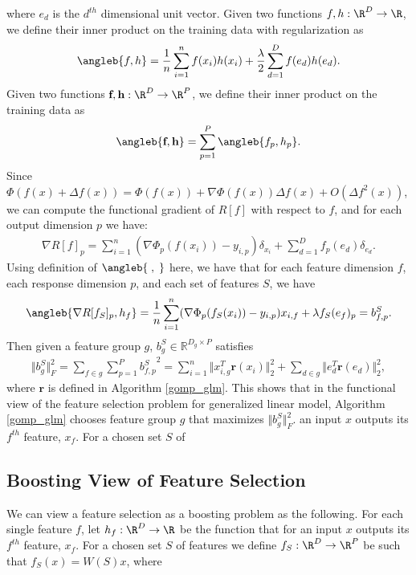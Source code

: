 where $e_d$ is the $d^{th}$ dimensional unit vector.
Given two functions $f, h : \R^D \rightarrow \R$, we define their inner product 
on the training data with regularization as 
\begin{align}
\angleb{f, h} = \frac{1}{n} 
  \sum _{i=1}^n f(x_i)h(x_i) + \frac{\lambda}{2} \sum _{d=1}^D f(e_d)h(e_d).
\end{align}
Given two functions $\textbf{f}, \textbf{h}: \R^D \rightarrow \R^P$, 
we define their inner product on the training data as 
\begin{align}
  \angleb{\textbf{f}, \textbf{h}} = \sum _{p=1}^P \angleb{f_p, h_p}.
\end{align}
Since $\Phi(f(x) + \Delta f(x)) = \Phi(f(x)) + \nabla\Phi(f(x))\Delta f(x) + 
O(\Delta f^2(x))$,
we can compute the functional gradient of $R[f]$
with respect to $f$, and for each output dimension $p$ we have:
\begin{align}
  \nabla R[f]_p = \sum_{i=1}^n (\nabla\Phi_p(f(x_i)) - y_{i,p})\delta_{x_i} 
    + \sum _{d=1}^D f_p(e_d)\delta_{e_d}.
\end{align}
Using definition of $\angleb{\;,\;}$ here, we have that
for each feature dimension $f$, each response dimension $p$, 
  and each set of features $S$, we have  
\begin{align}
  \angleb{\nabla R[f_S]_p , h_f} = 
    \frac{1}{n}\sum_{i=1}^n (\nabla\Phi_p(f_S(x_i)) - y_{i,p})x_{i,f}
    + \lambda f_S(e_f)_p = b_{f,p}^S. 
\end{align}
Then given a feature group $g$, $b_{g}^S \in \mathbb{R}^{D_g \times P}$ satisfies 
\begin{align}
  \Vert b_{g}^S \Vert _F^2 = \sum _{f \in g} \sum _{p=1}^P {b_{f,p}^S}^2 = 
    \sum _{i=1}^n \Vert x_{i,g}^T\textbf{r}(x_{i}) \Vert _2^2  + \sum _{d \in g} \Vert e_d^T\textbf{r}(e_d) \Vert _2^2,
\end{align} where
$\textbf{r}$ is defined in Algorithm \ref{gomp_glm}. This shows that in the functional view of the 
feature selection problem for generalized linear model, Algorithm \ref{gomp_glm} chooses
feature group $g$ that maximizes $\Vert b_{g}^S \Vert _F^2$.
an input $x$ outputs its $f^{th}$ feature, $x_f$. 
For a chosen set $S$ of 
\subsection{Boosting View of Feature Selection}
We can view a feature selection as a boosting problem as the following. 
For each single feature $f$, let $h_f : \R^D \rightarrow \R$ be the function that for 
an input $x$ outputs its $f^{th}$ feature, $x_f$. 
For a chosen set $S$ of features we 
define $f_S: \R^D \rightarrow \R^P$ be such that 
$f_S(x) = W(S)x$, where 
